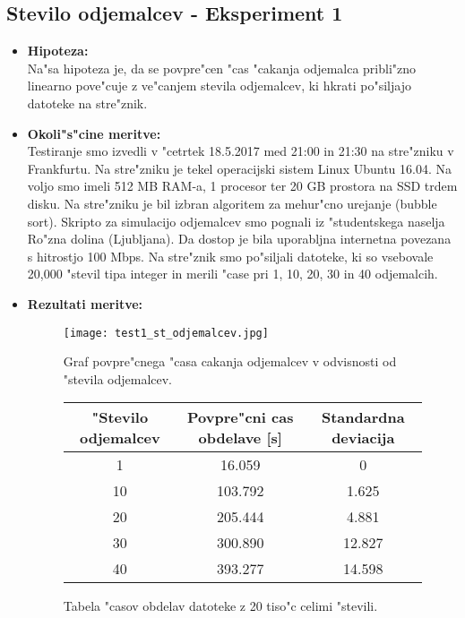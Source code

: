 \subsection{Stevilo odjemalcev - Eksperiment 1}
\begin{itemize}
	\item \textbf{Hipoteza: }  \\
		Na"sa hipoteza je, da se povpre"cen "cas "cakanja odjemalca pribli"zno linearno pove"cuje z ve"canjem stevila odjemalcev, ki hkrati po"siljajo datoteke na stre"znik.
			
	\item \textbf{Okoli"s"cine meritve: } \\
		Testiranje smo izvedli v "cetrtek 18.5.2017 med 21:00 in 21:30 na stre"zniku v Frankfurtu. Na stre"zniku je tekel operacijski sistem Linux Ubuntu 16.04. Na voljo smo imeli 512 MB RAM-a, 1 procesor ter 20 GB prostora na SSD trdem disku. Na stre"zniku je bil izbran algoritem za mehur"cno urejanje (bubble sort). Skripto za simulacijo odjemalcev smo pognali iz "studentskega naselja Ro"zna dolina (Ljubljana). Da dostop je bila uporabljna internetna povezana s hitrostjo 100 Mbps. 
		Na stre"znik smo po"siljali datoteke, ki so vsebovale 20,000 "stevil tipa integer in merili "case pri 1, 10, 20, 30 in 40 odjemalcih.

 	\item \textbf{Rezultati meritve: }  \\
		
	\begin{figure}[!htb]
  	\centering
  	  \texttt{[image: test1\_st\_odjemalcev.jpg]}
  	\caption{Graf povpre"cnega "casa cakanja odjemalcev v odvisnosti od "stevila odjemalcev.}
  	\label{8_graf_st_odjemalcev}
	\end{figure}

	\begin{figure}[!htbp]
  	\centering
  	\begin{tabular}{ | c | c | c | }
    	\hline
    	"Stevilo odjemalcev & Povpre"cni cas obdelave [s] & Standardna deviacija\\ \hline
    	1 & 16.059     & 0 \\ \hline
    	10 & 103.792 & 1.625\\ \hline
    	20 & 205.444 & 4.881\\ \hline
    	30 & 300.890 & 12.827\\ \hline
    	40 & 393.277 & 14.598\\ \hline
  	\end{tabular}
  	\caption{Tabela "casov obdelav datoteke z 20 tiso"c celimi "stevili.}
  	\label{8_table1}
  	\centering
	\end{figure}


\end{itemize}
